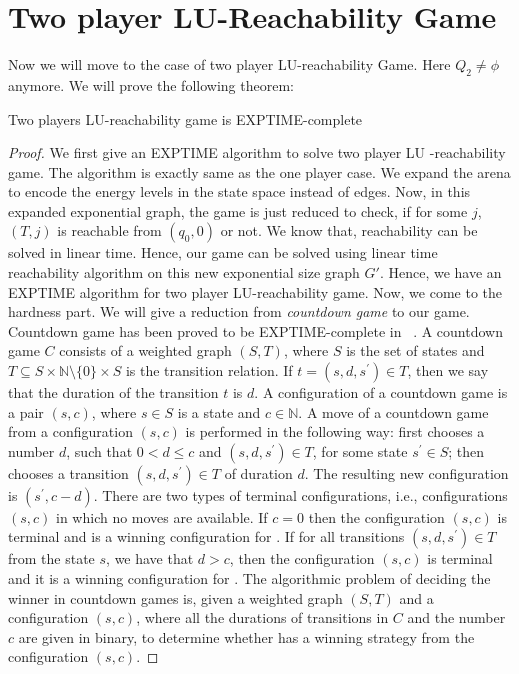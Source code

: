 \section{Two player LU-Reachability Game}
Now we will move to the case of two player LU-reachability Game. Here $Q_2 \not = \phi$ anymore. We will prove the following theorem:
\begin{theorem}
\label{exp-complete}
Two players LU-reachability game is EXPTIME-complete
\end{theorem}
\begin{proof}
We first give an EXPTIME algorithm to solve two player LU -reachability game. The algorithm is exactly same as the one player case. We expand the arena to encode the energy levels in the state space instead of edges. Now, in this expanded exponential graph, the game is just reduced to check, if for some $j$, $(T,j)$ is reachable from $(q_0,0)$ or not. We know that, reachability can be solved in linear time. Hence, our game can be solved using linear time reachability algorithm on this new exponential size graph $G'$. Hence, we have an EXPTIME algorithm for two player LU-reachability game.
\vskip 0.5cm
Now, we come to the hardness part. We will give a reduction from \textit{countdown game} to our game. Countdown game has been proved to be EXPTIME-complete in ~\cite{JurdzinskiLS07}.
\vskip 0.3cm
A countdown game $C$ consists of a weighted graph $(S, T)$, where $S$ is the set of states and $T \subseteq S \times \mathbb{N} \setminus \{0\} \times S$ is the transition relation. If $t=(s,d,s^{\prime}) \in T$, then we say
that the duration of the transition $t$ is $d$. A configuration of a countdown game is a
pair $(s,c)$, where $s \in S$ is a state and $c \in \mathbb{N}$. A move of a countdown game from a
configuration $(s,c)$ is performed in the following way: first  chooses a number $d$, such that $0 < d \leq c$ and $(s,d,s^{\prime}) \in T$, for some state $s^{\prime} \in S$; then  chooses a transition $(s,d,s^{\prime}) \in T$ of duration $d$. The resulting new configuration is $(s^{\prime},c-d)$. There are two types of terminal configurations, i.e., configurations $(s,c)$ in which no moves are available. If $c = 0$ then the configuration $(s, c)$ is terminal and is a winning
configuration for . If for all transitions $(s, d, s^{\prime}) \in T$ from the state $s$, we have
that $d > c$, then the configuration $(s, c)$ is terminal and it is a winning configuration for . The algorithmic problem of deciding the winner in countdown games is, given a weighted graph $(S, T)$ and a configuration $(s, c)$, where all the durations of transitions in $C$ and the number $c$ are given in binary, to determine whether  has a winning
strategy from the configuration $(s, c)$.
\vskip 0.3cm
 

\end{proof}
